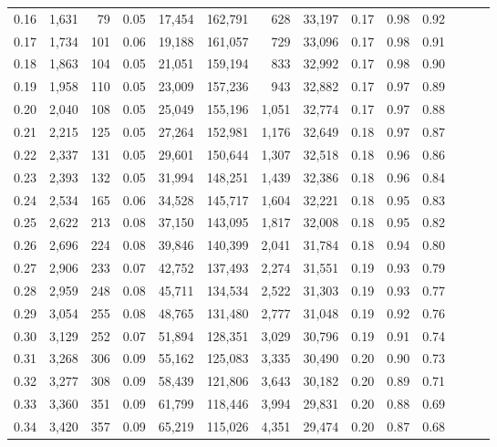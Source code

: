 \begin{tabular}{rrrrrrrrrrrrrr}
0.16 &  1,631 &   79 &  0.05 &   17,454 &  162,791 &     628 &  33,197 &  0.17 &  0.98 &      0.92 \\
0.17 &  1,734 &  101 &  0.06 &   19,188 &  161,057 &     729 &  33,096 &  0.17 &  0.98 &      0.91 \\
0.18 &  1,863 &  104 &  0.05 &   21,051 &  159,194 &     833 &  32,992 &  0.17 &  0.98 &      0.90 \\
0.19 &  1,958 &  110 &  0.05 &   23,009 &  157,236 &     943 &  32,882 &  0.17 &  0.97 &      0.89 \\
0.20 &  2,040 &  108 &  0.05 &   25,049 &  155,196 &   1,051 &  32,774 &  0.17 &  0.97 &      0.88 \\
0.21 &  2,215 &  125 &  0.05 &   27,264 &  152,981 &   1,176 &  32,649 &  0.18 &  0.97 &      0.87 \\
0.22 &  2,337 &  131 &  0.05 &   29,601 &  150,644 &   1,307 &  32,518 &  0.18 &  0.96 &      0.86 \\
0.23 &  2,393 &  132 &  0.05 &   31,994 &  148,251 &   1,439 &  32,386 &  0.18 &  0.96 &      0.84 \\
0.24 &  2,534 &  165 &  0.06 &   34,528 &  145,717 &   1,604 &  32,221 &  0.18 &  0.95 &      0.83 \\
0.25 &  2,622 &  213 &  0.08 &   37,150 &  143,095 &   1,817 &  32,008 &  0.18 &  0.95 &      0.82 \\
0.26 &  2,696 &  224 &  0.08 &   39,846 &  140,399 &   2,041 &  31,784 &  0.18 &  0.94 &      0.80 \\
0.27 &  2,906 &  233 &  0.07 &   42,752 &  137,493 &   2,274 &  31,551 &  0.19 &  0.93 &      0.79 \\
0.28 &  2,959 &  248 &  0.08 &   45,711 &  134,534 &   2,522 &  31,303 &  0.19 &  0.93 &      0.77 \\
0.29 &  3,054 &  255 &  0.08 &   48,765 &  131,480 &   2,777 &  31,048 &  0.19 &  0.92 &      0.76 \\
0.30 &  3,129 &  252 &  0.07 &   51,894 &  128,351 &   3,029 &  30,796 &  0.19 &  0.91 &      0.74 \\
0.31 &  3,268 &  306 &  0.09 &   55,162 &  125,083 &   3,335 &  30,490 &  0.20 &  0.90 &      0.73 \\
0.32 &  3,277 &  308 &  0.09 &   58,439 &  121,806 &   3,643 &  30,182 &  0.20 &  0.89 &      0.71 \\
0.33 &  3,360 &  351 &  0.09 &   61,799 &  118,446 &   3,994 &  29,831 &  0.20 &  0.88 &      0.69 \\
0.34 &  3,420 &  357 &  0.09 &   65,219 &  115,026 &   4,351 &  29,474 &  0.20 &  0.87 &      0.68 \\

\end{tabular}
